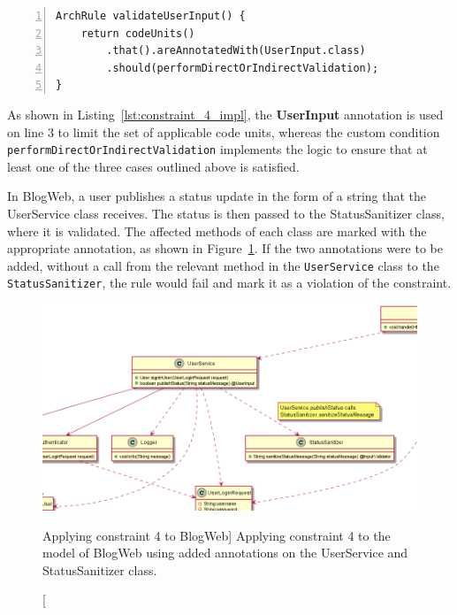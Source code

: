 \begin{minipage}{\linewidth}
\begin{lstlisting}[caption={Rule definition for constraint 4.}, captionpos=b, label=lst:constraint_4_impl, numbers=left]
ArchRule validateUserInput() {
    return codeUnits()
        .that().areAnnotatedWith(UserInput.class)
        .should(performDirectOrIndirectValidation);
}
\end{lstlisting}
\end{minipage}

As shown in Listing~\ref{lst:constraint_4_impl}, the \textbf{UserInput} annotation is used on line 3 to limit the set of applicable code units, whereas the custom condition \texttt{performDirectOrIndirect\-Validation} implements the logic to ensure that at least one of the three cases outlined above is satisfied.

In BlogWeb, a user publishes a status update in the form of a string that the UserService class receives. The status is then passed to the StatusSanitizer class, where it is validated. The affected methods of each class are marked with the appropriate annotation, as shown in Figure~\ref{fig:validate_input_toy_system}. If the two annotations were to be added, without a call from the relevant method in the \texttt{UserService} class to the \texttt{StatusSanitizer}, the rule would fail and mark it as a violation of the constraint.

\begin{figure}
    \centering
    \includegraphics[width=\textwidth]{figure/toyexamples/validate_input_toy_system.png}
    \caption
        [Applying constraint 4 to BlogWeb]
        {Applying constraint 4 to the model of BlogWeb using added annotations on the UserService and StatusSanitizer class.}
    \label{fig:validate_input_toy_system}
\end{figure}


